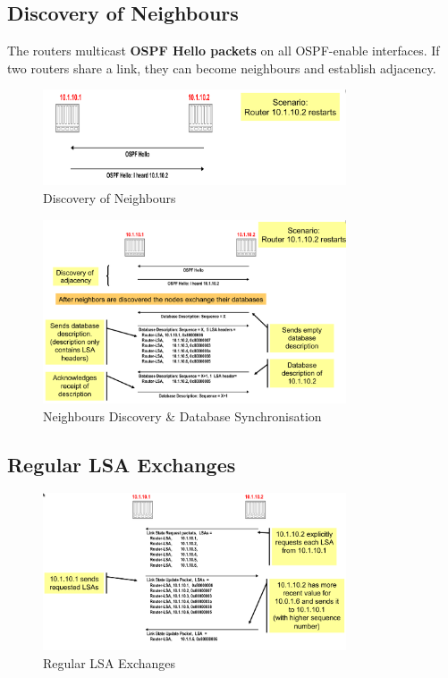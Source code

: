\documentclass[a4paper,11pt]{article}
\begin{document}
\subsection{Discovery of Neighbours}
The routers multicast \textbf{OSPF Hello packets} on all OSPF-enable interfaces. 
If two routers share a link, they can become neighbours and establish adjacency.
\begin{figure}[H]
    \centering
    \includegraphics[width=0.8\textwidth]{./images/neighbour_discovery.png}
    \caption{Discovery of Neighbours}
\end{figure}

\begin{figure}[H]
    \centering
    \includegraphics[width=0.8\textwidth]{./images/neighbour_discovery_and_database_synchronisation.png}
    \caption{Neighbours Discovery \& Database Synchronisation}
\end{figure}

\subsection{Regular LSA Exchanges}
\begin{figure}[H]
    \centering
    \includegraphics[width=0.8\textwidth]{./images/regular_lsa_exchanges.png}
    \caption{Regular LSA Exchanges}
\end{figure}
\end{document}
